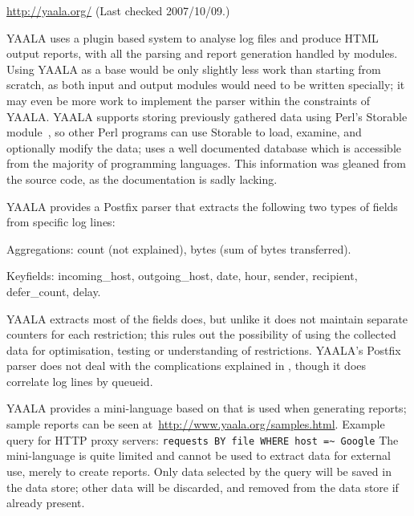 \noindent{}\url{http://yaala.org/} \newline{}
(Last checked 2007/10/09.)

YAALA uses a plugin based system to analyse log files and produce HTML
output reports, with all the parsing and report generation handled by
modules.  Using YAALA as a base would be only slightly less work than
starting from scratch, as both input and output modules would need to be
written specially; it may even be more work to implement the parser within
the constraints of YAALA\@.  YAALA supports storing previously gathered
data using Perl's Storable module~\cite{perl-storable}, so other Perl
programs can use Storable to load, examine, and optionally modify the data;
\parsername{} uses a well documented database which is accessible from the
majority of programming languages.  This information was gleaned from the
source code, as the documentation is sadly lacking.

YAALA provides a Postfix parser that extracts the following two types of
fields from specific log lines:

\begin{eqlist}

    \item [Aggregations:] count (not explained), bytes (sum of bytes
        transferred).

    \item [Keyfields:] incoming\_host, outgoing\_host, date, hour, sender,
        recipient, defer\_count, delay.

\end{eqlist}

YAALA extracts most of the fields \parsername{} does, but unlike
\parsername{} it does not maintain separate counters for each restriction;
this rules out the possibility of using the collected data for
optimisation, testing or understanding of restrictions.  YAALA's Postfix
parser does not deal with the complications explained in
, though it does correlate log lines by queueid.

YAALA provides a mini-language based on \SQL{} that is used when generating
reports; sample reports can be seen
at~\url{http://www.yaala.org/samples.html}.  Example query for HTTP proxy
servers: \newline{} \tab{} \texttt{requests BY file WHERE host =\~{}
Google} \newline{} The mini-language is quite limited and cannot be used to
extract data for external use, merely to create reports.  Only data
selected by the query will be saved in the data store; other data will be
discarded, and removed from the data store if already present.

